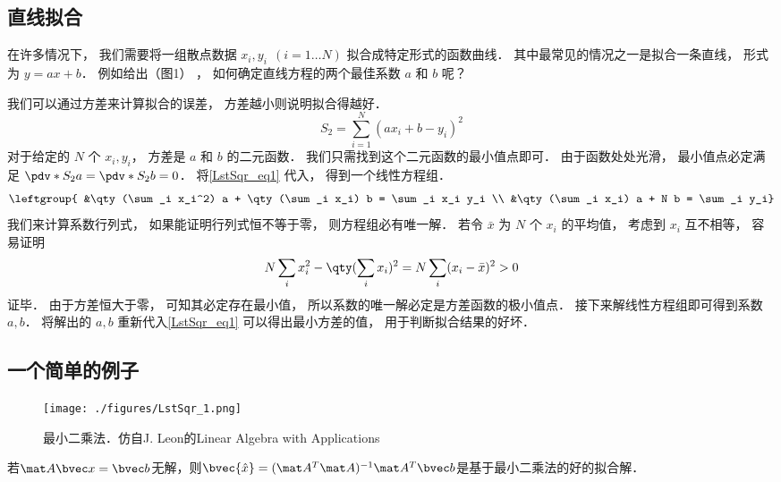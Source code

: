 
\begin{issues}
\issueTODO
\end{issues}


\subsection{直线拟合}
在许多情况下， 我们需要将一组散点数据 $x_i, y_i \ \ (i = 1\dots N)$ 拟合成特定形式的函数曲线． 其中最常见的情况之一是拟合一条直线， 形式为 $y = ax + b$． 例如给出（图1）%
， 如何确定直线方程的两个最佳系数 $a$ 和 $b$ 呢？

我们可以通过方差来计算拟合的误差， 方差越小则说明拟合得越好．
\begin{equation}\label{LstSqr_eq1}
S_2 = \sum_{i = 1}^N (a x_i + b - y_i)^2
\end{equation}
对于给定的 $N$ 个 $x_i, y_i$， 方差是 $a$ 和 $b$ 的二元函数． 我们只需找到这个二元函数的最小值点即可． 由于函数处处光滑， 最小值点必定满足 $\pdv*{S_2}{a} = \pdv*{S_2}{b} = 0$． 将\autoref{LstSqr_eq1} 代入， 得到一个线性方程组．
\begin{equation}
\leftgroup{
&\qty(\sum_i x_i^2) a + \qty(\sum_i x_i) b = \sum_i x_i y_i \\
&\qty(\sum_i x_i) a + N b = \sum_i y_i}
\end{equation}
我们来计算系数行列式， 如果能证明行列式恒不等于零， 则方程组必有唯一解．%
若令 $\bar x$ 为 $N$ 个 $x_i$ 的平均值， 考虑到 $x_i$ 互不相等， 容易证明
\begin{equation}
N\sum_i x_i^2 - \qty(\sum_i x_i)^2 = N\sum_i (x_i - \bar x)^2 > 0
\end{equation}
证毕． 由于方差恒大于零， 可知其必定存在最小值， 所以系数的唯一解必定是方差函数的极小值点． 接下来解线性方程组即可得到系数 $a, b$． 将解出的 $a,b$ 重新代入\autoref{LstSqr_eq1} 可以得出最小方差的值， 用于判断拟合结果的好坏．

\subsection{一个简单的例子}
\begin{figure}[ht]
\centering
\texttt{[image: ./figures/LstSqr\_1.png]}
\caption{最小二乘法．仿自J. Leon的Linear Algebra with Applications} \label{LstSqr_fig1}
\end{figure}
若$\mat A \bvec x = \bvec b$无解，则$\bvec {\hat x} = (\mat A^T \mat A)^{-1}\mat A^T \bvec b$是基于最小二乘法的好的拟合解．

